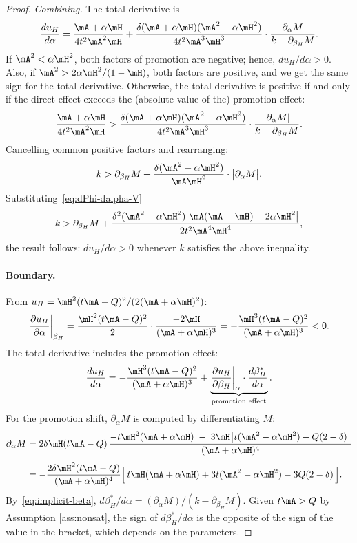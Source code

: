 \begin{proof}
\textit{Combining.}\;
The total derivative is
\[
\frac{du_H}{d\alpha}
= \frac{\mA+\alpha\mH}{4t^2\mA^2\mH}
+ \frac{\delta (\mA+\alpha\mH)(\mA^2 - \alpha\mH^2)}{4t^2\mA^3\mH^3}
\cdot\frac{\partial_\alpha M}{k - \partial_{\beta_H} M}.
\]
If $\mA^2<\alpha\mH^2$, both factors of promotion are negative; hence, $du_H/d\alpha>0$. Also, if $\mA^2 > 2\alpha \mH^2 / (1-\mH)$, both factors are positive, and we get the same sign for the total derivative. Otherwise, the total derivative is positive if and only if the direct effect exceeds the (absolute value of the) promotion effect:
\[
\frac{\mA+\alpha\mH}{4t^2\mA^2\mH}
> \frac{\delta (\mA+\alpha\mH)(\mA^2 - \alpha\mH^2)}{4t^2\mA^3\mH^3}
\cdot\frac{|\partial_\alpha M|}{k - \partial_{\beta_H} M}.
\]
Cancelling common positive factors and rearranging:
\[
k > \partial_{\beta_H} M
+ \frac{\delta(\mA^2 - \alpha\mH^2)}{\mA\mH^2}\cdot\bigl|\partial_\alpha M\bigr|.
\]
Substituting~\eqref{eq:dPhi-dalpha-V} 
\begin{equation}\label{eq:kbar-alpha-V}
k>\partial_{\beta_H} M
+ \frac{\delta^2(\mA^2 - \alpha\mH^2)\bigl|  \mA(\mA - \mH) - 2\alpha\mH^2\bigr|}{2t^2\mA^4\mH^4},
\end{equation}
the result follows: $du_H/d\alpha > 0$ whenever $k$ satisfies the above inequality.

 
\paragraph{Boundary.}
From $u_H = \mH^2 (t\mA-Q)^2/(2(\mA+\alpha\mH)^2)$:
\[
\left.\frac{\partial u_H}{\partial\alpha}\right|_{\beta_H}
= \frac{\mH^2 (t\mA-Q)^2}{2}\cdot\frac{-2\mH}{(\mA+\alpha\mH)^3}
= -\frac{\mH^3 (t\mA-Q)^2}{(\mA+\alpha\mH)^3} < 0.
\]
The total derivative includes the promotion effect:
\[
\frac{du_H}{d\alpha}
= -\frac{\mH^3 (t\mA-Q)^2}{(\mA+\alpha\mH)^3}
+ \underbrace{\left.\frac{\partial u_H}{\partial\beta_H}\right|_{\alpha} \cdot \frac{d\beta_H^*}{d\alpha}}_{\text{promotion effect}}.
\]
For the promotion shift, $\partial_\alpha M$ is computed by differentiating $M$:
\begin{align}
\label{eq:dPhi-dalpha-Vbnd}
\partial_\alpha M
&= 2\delta\mH (t\mA-Q)\,\dfrac{-t\mH^2(\mA+\alpha\mH)\;-\;3\mH\bigl[t(\mA^2-\alpha\mH^2)-Q(2-\delta)\bigr]}{(\mA+\alpha\mH)^4}\notag\\[4pt]
&= -\frac{2\delta\mH^2 (t\mA-Q)}{(\mA+\alpha\mH)^4}\Bigl[\,t\mH(\mA+\alpha\mH)+3t(\mA^2-\alpha\mH^2)-3Q(2-\delta)\,\Bigr].
\end{align}
By~\eqref{eq:implicit-beta}, $d\beta_H^*/d\alpha = (\partial_\alpha M)/(k - \partial_{\beta_H} M)$. 
Given $t\mA>Q$ by Assumption \ref{ass:nonsat}, the sign of $d\beta_H^*/d\alpha$ is the opposite of the sign of the value in the bracket, which depends on the parameters.


\end{proof}

